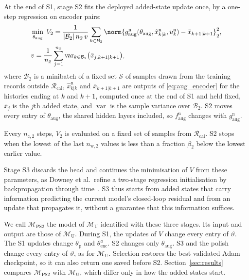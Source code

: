At the end of S1, stage S2 fits the deployed added-state update once, by a
one-step regression on encoder pairs:
{\small
\begin{equation}
\begin{aligned}
 &\min_{\theta_{\mathrm{aug}}}\;
 V_2=\frac{1}{|\mathcal B_2|\,n_{\bar x}\,v}\sum_{k\in\mathcal B_2}
  \norm{g^{\mathrm n}_{\mathrm{aug}}(\theta_{\mathrm{aug}},\hat x^{\mathrm n}_{k|k},u^{\mathrm n}_k)
  -\bar x_{k+1|k+1}}_2^2,\\
 &v=\frac{1}{n_{\bar x}}\sum_{j=1}^{n_{\bar x}}
  \operatorname{var}_{k\in\mathcal B_2}\bigl(\bar x_{j,k+1|k+1}\bigr),
\end{aligned}
 \label{eq:ps2_s2}
\end{equation}
}
where $\mathcal B_2$ is a minibatch of a fixed set $\mathcal S$ of samples drawn
from the training records outside $\mathcal R_{\mathrm{cal}}$,
$\hat x^{\mathrm n}_{k|k}$ and $\bar x_{k+1|k+1}$ are outputs of
\eqref{eq:aug_encoder} for the histories ending at $k$ and $k+1$, computed once
at the end of S1 and held fixed, $\bar x_j$ is the $j$th added state, and
$\operatorname{var}$ is the sample variance over $\mathcal B_2$.
S2 moves every entry of $\theta_{\mathrm{aug}}$, the shared hidden layers
included, so $f^{\mathrm n}_{\mathrm{aug}}$ changes with
$g^{\mathrm n}_{\mathrm{aug}}$.

Every $n_{\mathrm c,2}$ steps, $V_2$ is evaluated on a fixed set of samples from
$\mathcal R_{\mathrm{cal}}$.
S2 stops when the lowest of the last $n_{\mathrm w,2}$ values is less than a
fraction $\beta_2$ below the lowest earlier value.

Stage S3 discards the head and continues the minimisation of $V$ from these
parameters, as Downey et al.\ refine a two-stage regression initialisation by
backpropagation through time~\cite[Sec.~4.2]{downey2017psrnn}.
S3 thus starts from added states that carry information predicting the
current model's closed-loop residual and from an update that propagates it,
without a guarantee that this information suffices.

We call $\mathcal M_{\mathrm{PS2}}$ the model of $\mathcal M_{\mathrm U}$
identified with these three stages.
Its input and output are those of $\mathcal M_{\mathrm U}$.
During S1, the updates of $V$ change every entry of $\vartheta$.
The S1 updates change $\theta_{\mathrm p}$ and $\theta^a_{\mathrm{enc}}$.
S2 changes only $\theta_{\mathrm{aug}}$.
S3 and the polish change every entry of $\vartheta$, as for
$\mathcal M_{\mathrm U}$.
Selection restores the best validated Adam checkpoint, so it can also return
one saved before S2.
Section~\ref{sec:results} compares $\mathcal M_{\mathrm{PS2}}$ with
$\mathcal M_{\mathrm U}$, which differ only in how the added states start.
